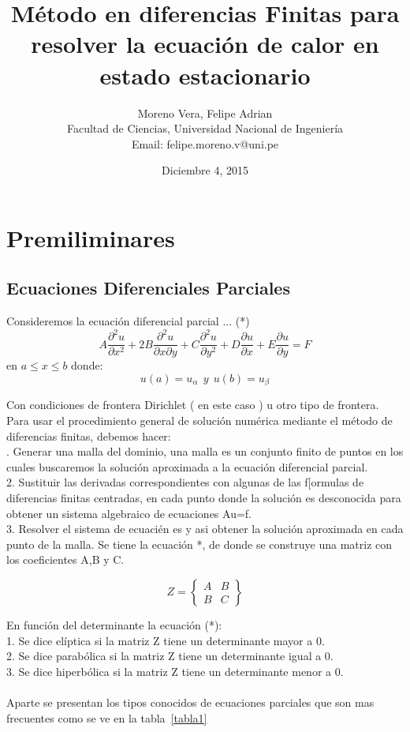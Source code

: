 \documentclass[11pt,a4paper]{article}
\title{\LARGE{\textbf{Método en diferencias Finitas para resolver la ecuación de calor en estado estacionario}}}
\date{Diciembre 4, 2015}
\author{Moreno Vera, Felipe Adrian\\ Facultad de Ciencias, Universidad Nacional de Ingeniería\\Email: felipe.moreno.v@uni.pe } %
\begin{document}
\maketitle
\tableofcontents
\listoftables
\listoffigures
\newpage
\section{Premiliminares}
\subsection{Ecuaciones Diferenciales Parciales}
\thispagestyle{empty}
Consideremos la ecuación diferencial parcial ... (*)
$$
A\frac{\partial^2u}{\partial x^2} + 2B\frac{\partial^2u}{\partial x \partial y}+ C\frac{\partial^2u}{\partial y^2} +D\frac{\partial u}{\partial x}+E\frac{\partial u}{\partial y}= F
$$
en
$ a \le x \le b $ donde: \[u(a) = u_{\alpha} ~~ y ~~ u(b) = u_{\beta}\] 

Con condiciones de frontera Dirichlet ( en este caso ) u otro tipo de frontera. Para usar el procedimiento general de solución numérica mediante el método de diferencias finitas, debemos hacer:\\
. Generar una malla del dominio, una malla es un conjunto finito de puntos en los cuales buscaremos la solución aproximada a la ecuación diferencial parcial.
\\
2. Sustituir las derivadas correspondientes con algunas de las f[ormulas de diferencias finitas centradas, en cada punto donde la solución es desconocida para obtener un sistema algebraico de ecuaciones Au=f.\\
3. Resolver el sistema de ecuacién es y asi obtener la solución aproximada en cada punto de la malla.
\newline
Se tiene la ecuación *, de donde se construye una matriz con los coeficientes A,B y C.

$$
Z=\left\{\begin{array}{crl}
    A & B\\
    B & C
    \end{array}\right\}
$$

En función del determinante la ecuación (*):\\
1. Se dice elíptica si la matriz Z tiene un determinante mayor a 0.\\
2. Se dice parabólica si la matriz Z tiene un determinante igual a 0.\\
3. Se dice hiperbólica si la matriz Z tiene un determinante menor a 0.\\
\\
Aparte se presentan los tipos conocidos de ecuaciones parciales que son mas frecuentes como se ve en la tabla~\ref{tabla1}
\end{document}
